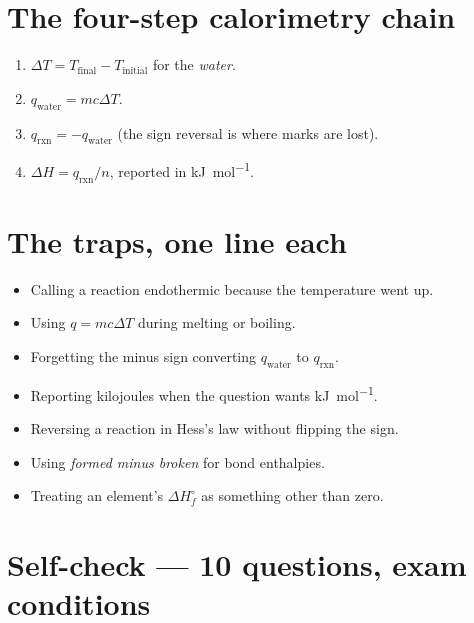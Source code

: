 \documentclass{apchem-worksheet}
\begin{document}
\section*{\sffamily The four-step calorimetry chain}

\begin{enumerate}[leftmargin=*,itemsep=0.18em]
  \item $\Delta T = T_{\text{final}} - T_{\text{initial}}$ for the
        \emph{water}.
  \item $q_{\text{water}} = mc\Delta T$.
  \item $q_{\text{rxn}} = -q_{\text{water}}$ \quad(the sign reversal is
        where marks are lost).
  \item $\Delta H = q_{\text{rxn}} / n$, reported in
        \si{\kilo\joule\per\mole}.
\end{enumerate}

\section*{\sffamily The traps, one line each}

\begin{itemize}[leftmargin=*,itemsep=0.22em]
  \item Calling a reaction endothermic because the temperature went up.
  \item Using $q = mc\Delta T$ during melting or boiling.
  \item Forgetting the minus sign converting $q_{\text{water}}$ to
        $q_{\text{rxn}}$.
  \item Reporting kilojoules when the question wants
        \si{\kilo\joule\per\mole}.
  \item Reversing a reaction in Hess's law without flipping the sign.
  \item Using \emph{formed minus broken} for bond enthalpies.
  \item Treating an element's $\Delta H_f^\circ$ as something other than
        zero.
\end{itemize}

\section*{\sffamily Self-check --- 10 questions, exam conditions}
\end{document}
